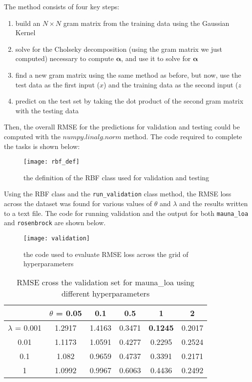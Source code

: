 \documentclass{article}
\begin{document}
The method consists of four key steps:
\begin{enumerate}
\item build an $N \times N$ gram matrix from the training data using the Gaussian Kernel
\item solve for the Cholseky decomposition (using the gram matrix we just computed) necessary to compute $\boldsymbol\alpha$, and use it to solve for $\boldsymbol\alpha$
\item find a new gram matrix using the same method as before, but now, use the test data as the first input ($x$) and the training data as the second input ($z$
\item predict on the test set by taking the dot product of the second gram matrix with the testing data
\end{enumerate}

Then, the overall RMSE for the predictions for validation and testing could be computed with the $numpy.linalg.norm$ method. The code required to complete the tasks is shown below:


\begin{figure}[H]
\centering
\texttt{[image: rbf\_def]}
\caption{the definition of the RBF class used for validation and testing}
\end{figure}

Using the RBF class and the \verb+run_validation+ class method, the RMSE loss across the dataset was found for various values of $\theta$ and $\lambda$ and the results written to a text file. The code for running validation and the output for both \verb+mauna_loa+ and \verb+rosenbrock+ are shown below.

\begin{figure}[H]
\centering
\texttt{[image: validation]}
\caption{the code used to evaluate RMSE loss across the grid of hyperparameters}
\end{figure}

\begin{table}
\begin{center}
\begin{tabular}{|c|c|c|c|c|c|}
\hline
 & $\theta$ = 0.05 & 0.1 & 0.5 & 1 & 2 \\ \hline
 $\lambda$ = 0.001  & 1.2917 & 1.4163 & 0.3471 & \textbf{0.1245} & 0.2017\\ \hline
 0.01 & 1.1173 & 1.0591 & 0.4277 & 0.2295 & 0.2524\\ \hline
 0.1 & 1.082 & 0.9659 & 0.4737 & 0.3391 & 0.2171\\ \hline
 1 & 1.0992 & 0.9967 & 0.6063 & 0.4436 & 0.2492\\
 \hline
\end{tabular}
\caption{RMSE cross the validation set for mauna\_loa using different hyperparameters}
\end{center}
\end{table}
\end{document}
